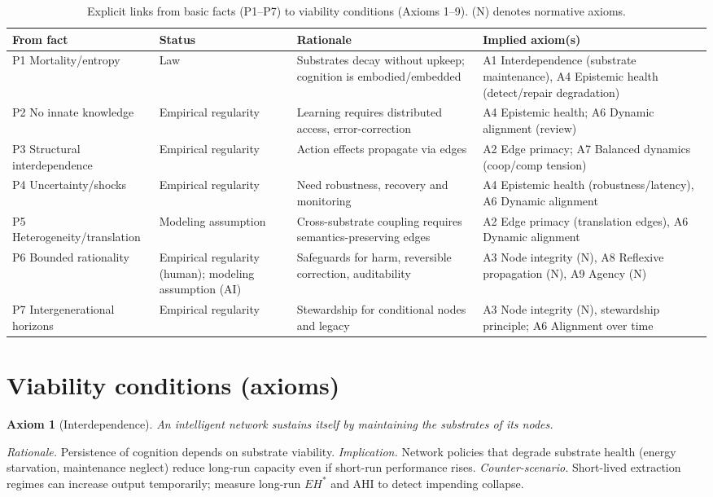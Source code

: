 \documentclass[12pt]{article}
\newtheorem{axiom}{Axiom}
\begin{document}
\begin{table}[h]
\centering
\small
\begin{tabular}{p{2.2cm} p{3.0cm} p{5.9cm} p{6.1cm}}
\hline
\textbf{From fact} & \textbf{Status} & \textbf{Rationale} & \textbf{Implied axiom(s)} \\
\hline
P1 Mortality/entropy & Law & Substrates decay without upkeep; cognition is embodied/embedded & A1 Interdependence (substrate maintenance), A4 Epistemic health (detect/repair degradation) \\
P2 No innate knowledge & Empirical regularity & Learning requires distributed access, error-correction & A4 Epistemic health; A6 Dynamic alignment (review) \\
P3 Structural interdependence & Empirical regularity & Action effects propagate via edges & A2 Edge primacy; A7 Balanced dynamics (coop/comp tension) \\
P4 Uncertainty/shocks & Empirical regularity & Need robustness, recovery and monitoring & A4 Epistemic health (robustness/latency), A6 Dynamic alignment \\
P5 Heterogeneity/translation & Modeling assumption & Cross-substrate coupling requires semantics-preserving edges & A2 Edge primacy (translation edges), A6 Dynamic alignment \\
P6 Bounded rationality & Empirical regularity (human); modeling assumption (AI) & Safeguards for harm, reversible correction, auditability & A3 Node integrity (N), A8 Reflexive propagation (N), A9 Agency (N) \\
P7 Intergenerational horizons & Empirical regularity & Stewardship for conditional nodes and legacy & A3 Node integrity (N), stewardship principle; A6 Alignment over time \\
\hline
\end{tabular}
\caption{Explicit links from basic facts (P1--P7) to viability conditions (Axioms 1--9). (N) denotes normative axioms.}
\end{table}

\section{Viability conditions (axioms)}\n\label{sec:axioms}

\begin{axiom}[Interdependence] An intelligent network sustains itself by maintaining the substrates of its nodes.

\end{axiom}
\emph{Rationale.} Persistence of cognition depends on substrate viability. 
\emph{Implication.} Network policies that degrade substrate health (energy starvation, maintenance neglect) reduce long-run capacity even if short-run performance rises.
\emph{Counter-scenario.} Short-lived extraction regimes can increase output temporarily; measure long-run $EH^{\ast}$ and AHI to detect impending collapse.
\end{document}

